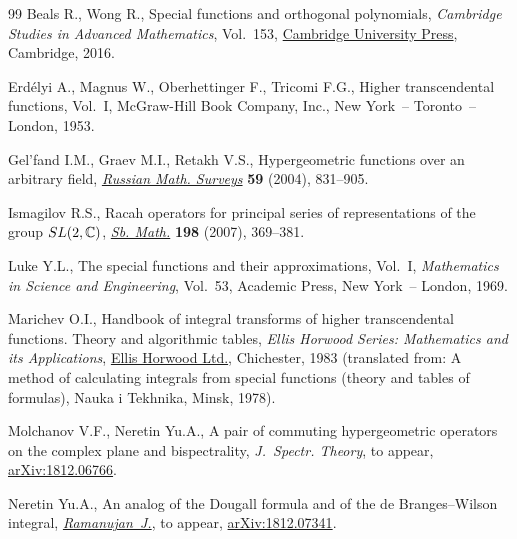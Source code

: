 \documentclass[11pt]{article}
\numberwithin{equation}{section}
\numberwithin{equation}{section}
\begin{document}
\begin{thebibliography}{99}
Beals R., Wong R., Special functions and orthogonal polynomials,
 \textit{Cambridge Studies in Advanced Mathematics}, Vol.~153, \href{https://doi.org/10.1017/CBO9781316227381}{Cambridge
 University Press}, Cambridge, 2016.

Erd\'elyi A., Magnus W., Oberhettinger F., Tricomi F.G., Higher transcendental
 functions, {V}ol.~{I}, McGraw-Hill Book Company, Inc., New York~-- Toronto~--
 London, 1953.

Gel'fand I.M., Graev M.I., Retakh V.S., Hypergeometric functions over an
 arbitrary field, \href{https://doi.org/10.1070/RM2004v059n05ABEH000771}{\textit{Russian Math. Surveys}} \textbf{59} (2004), 831--905.

Ismagilov R.S., Racah operators for principal series of representations of the
 group ${\rm SL}(2,{\mathbb C})$, \href{https://doi.org/10.1070/SM2007v198n03ABEH003840}{\textit{Sb. Math.}} \textbf{198} (2007),
 369--381.

Luke Y.L., The special functions and their approximations, {V}ol.~{I},
 \textit{Mathematics in Science and Engineering}, Vol.~53, Academic Press, New
 York~-- London, 1969.

Marichev O.I., Handbook of integral transforms of higher transcendental
 functions. Theory and algorithmic tables, \textit{Ellis Horwood Series: Mathematics
 and its Applications}, \href{https://doi.org/10.1002/zamm.19840640608}{Ellis Horwood Ltd.}, Chichester,
 1983 (translated from: A method of calculating integrals from special functions
(theory and tables of formulas), Nauka i Tekhnika, Minsk, 1978).

Molchanov V.F., Neretin Yu.A., A pair of commuting hypergeometric operators on
 the complex plane and bispectrality, \textit{J.~Spectr. Theory}, {t}o appear,
 \href{https://arxiv.org/abs/1812.06766}{arXiv:1812.06766}.

Neretin Yu.A., An analog of the {D}ougall formula and of the de
 {B}ranges--{W}ilson integral, \href{https://doi.org/10.1007/s11139-019-00218-0}{\textit{Ramanujan~J.}}, {t}o appear,
 \href{https://arxiv.org/abs/1812.07341}{arXiv:1812.07341}.

\end{thebibliography}
\end{document}
